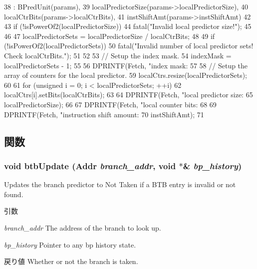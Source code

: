 \begin{DoxyCode}
38     : BPredUnit(params),
39       localPredictorSize(params->localPredictorSize),
40       localCtrBits(params->localCtrBits),
41       instShiftAmt(params->instShiftAmt)
42 {
43     if (!isPowerOf2(localPredictorSize)) {
44         fatal("Invalid local predictor size!\n");
45     }
46 
47     localPredictorSets = localPredictorSize / localCtrBits;
48 
49     if (!isPowerOf2(localPredictorSets)) {
50         fatal("Invalid number of local predictor sets! Check localCtrBits.\n");
51     }
52 
53     // Setup the index mask.
54     indexMask = localPredictorSets - 1;
55 
56     DPRINTF(Fetch, "index mask: %
57 
58     // Setup the array of counters for the local predictor.
59     localCtrs.resize(localPredictorSets);
60 
61     for (unsigned i = 0; i < localPredictorSets; ++i)
62         localCtrs[i].setBits(localCtrBits);
63 
64     DPRINTF(Fetch, "local predictor size: %
65             localPredictorSize);
66 
67     DPRINTF(Fetch, "local counter bits: %
68 
69     DPRINTF(Fetch, "instruction shift amount: %
70             instShiftAmt);
71 }
\end{DoxyCode}


\subsection{関数}
\hypertarget{classLocalBP_a101ada238eecd07cc6905c60272e2693}{
\subsubsection[{btbUpdate}]{\setlength{\rightskip}{0pt plus 5cm}void btbUpdate ({\bf Addr} {\em branch\_\-addr}, \/  void $\ast$\& {\em bp\_\-history})}}
\label{classLocalBP_a101ada238eecd07cc6905c60272e2693}
Updates the branch predictor to Not Taken if a BTB entry is invalid or not found. 
\begin{DoxyParams}{引数}
\item[{\em branch\_\-addr}]The address of the branch to look up. \item[{\em bp\_\-history}]Pointer to any bp history state. \end{DoxyParams}
\begin{DoxyReturn}{戻り値}
Whether or not the branch is taken. 
\end{DoxyReturn}


